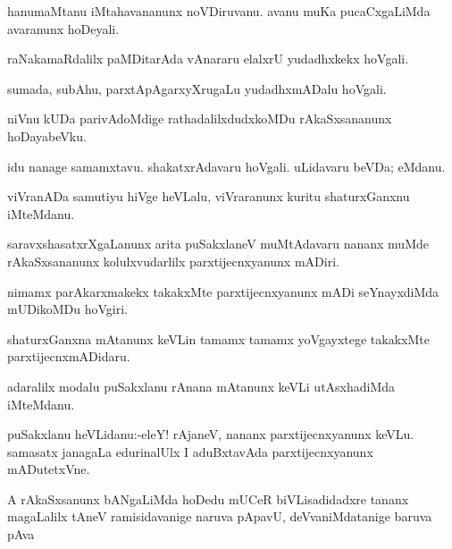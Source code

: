 \documentclass{article}
\begin{document}
\begin{mn}%
hanumaMtanu iMtahavananunx noVDiruvanu. avanu muKa pucaCxgaLiMda avaranunx hoDeyali.
\end{mn}

\begin{mn}%
raNakamaRdalilx paMDitarAda vAnararu elalxrU yudadhxkekx hoVgali.
\end{mn}

\begin{mn}%
sumada, subAhu, parxtApAgarxyXrugaLu yudadhxmADalu hoVgali.
\end{mn}

\begin{mn}%
niVnu kUDa parivAdoMdige rathadalilxdudxkoMDu rAkaSxsananunx hoDayabeVku.
\end{mn}

\begin{mn}%
idu nanage samamxtavu. shakatxrAdavaru hoVgali. uLidavaru beVDa; eMdanu.
\end{mn}

\begin{mn}%
viVranADa samutiyu hiVge heVLalu, viVraranunx kuritu shaturxGanxnu iMteMdanu.
\end{mn}

\begin{mn}%
saravxshasatxrXgaLanunx arita puSakxlaneV muMtAdavaru nananx muMde rAkaSxsananunx 
kolulxvudarlilx parxtijecnxyanunx mADiri.
\end{mn}

\begin{mn}%
nimamx parAkarxmakekx takakxMte parxtijecnxyanunx mADi seYnayxdiMda mUDikoMDu hoVgiri.
\end{mn}

\begin{mn}%
shaturxGanxna mAtanunx keVLin tamamx tamamx yoVgayxtege takakxMte parxtijecnxmADidaru.
\end{mn}

\begin{mn}%
adaralilx modalu puSakxlanu rAnana mAtanunx keVLi utAsxhadiMda iMteMdanu.
\end{mn}

\begin{mn}%
puSakxlanu heVLidanu:-eleY! rAjaneV, nananx parxtijecnxyanunx keVLu. samasatx janagaLa 
edurinalUlx I aduBxtavAda parxtijecnxyanunx mADutetxVne.
\end{mn}

\begin{mn}%
A rAkaSxsanunx bANgaLiMda hoDedu mUCeR biVLisadidadxre tananx magaLalilx tAneV 
ramisidavanige naruva pApavU, deVvaniMdatanige baruva pAva
\end{mn}
\end{document}
